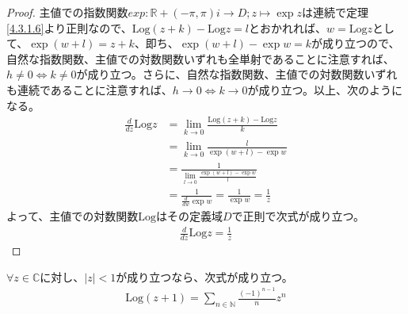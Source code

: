 \documentclass[dvipdfmx]{jsarticle}
\begin{document}
\begin{proof}
主値での指数関数$exp:\mathbb{R} + ( - \pi,\pi)i \rightarrow D;z \mapsto \exp z$は連続で定理\ref{4.3.1.6}より正則なので、$\mathrm{Log}(z + k) - \mathrm{Log}z = l$とおかれれば、$w = \mathrm{Log}z$として、$\exp(w + l) = z + k$、即ち、$\exp(w + l) - \exp w = k$が成り立つので、自然な指数関数、主値での対数関数いずれも全単射であることに注意すれば、$h \neq 0 \Leftrightarrow k \neq 0$が成り立つ。さらに、自然な指数関数、主値での対数関数いずれも連続であることに注意すれば、$h \rightarrow 0 \Leftrightarrow k \rightarrow 0$が成り立つ。以上、次のようになる。
\begin{align*}
\frac{d}{dz}\mathrm{Log}z &= \lim_{k \rightarrow 0}\frac{\mathrm{Log}(z + k) - \mathrm{Log}z}{k}\\
&= \lim_{k \rightarrow 0}\frac{l}{\exp(w + l) - \exp w}\\
&= \frac{1}{\lim_{l \rightarrow 0}\frac{\exp(w + l) - \exp w}{l}}\\
&= \frac{1}{\frac{d}{dw}\exp w} = \frac{1}{\exp w} = \frac{1}{z}
\end{align*}
よって、主値での対数関数$\mathrm{Log}$はその定義域$D$で正則で次式が成り立つ。
\begin{align*}
\frac{d}{dz}\mathrm{Log}z = \frac{1}{z}
\end{align*}
\end{proof}
\begin{thm}\label{4.3.3.7}
$\forall z \in \mathbb{C}$に対し、$|z| < 1$が成り立つなら、次式が成り立つ。
\begin{align*}
\mathrm{Log}(z + 1) = \sum_{n \in \mathbb{N}} {\frac{( - 1)^{n - 1}}{n}z^{n}}
\end{align*}
\end{thm}
\end{document}

